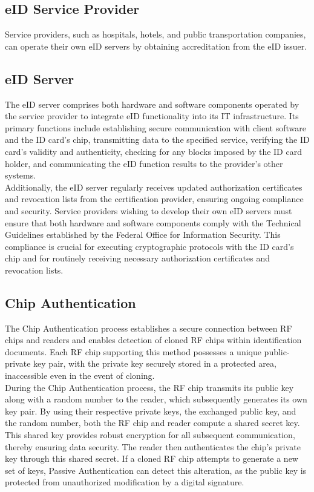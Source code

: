 \documentclass[pdflatex,sn-mathphys-num]{sn-jnl}%
\theoremstyle{thmstyleone}%
\theoremstyle{thmstyletwo}%
\theoremstyle{thmstylethree}%
\begin{document}
\subsection*{eID Service Provider}
Service providers, such as hospitals, hotels, and public transportation companies, can operate their own eID servers by obtaining accreditation from the eID issuer.

\subsection*{eID Server}

The eID server comprises both hardware and software components operated by the service provider to integrate eID functionality into its IT infrastructure. Its primary functions include establishing secure communication with client software and the ID card’s chip, transmitting data to the specified service, verifying the ID card’s validity and authenticity, checking for any blocks imposed by the ID card holder, and communicating the eID function results to the provider’s other systems.\\

Additionally, the eID server regularly receives updated authorization certificates and revocation lists from the certification provider, ensuring ongoing compliance and security. Service providers wishing to develop their own eID servers must ensure that both hardware and software components comply with the Technical Guidelines established by the Federal Office for Information Security. This compliance is crucial for executing cryptographic protocols with the ID card’s chip and for routinely receiving necessary authorization certificates and revocation lists.

\subsection*{Chip Authentication}

The Chip Authentication process establishes a secure connection between RF chips and readers and enables detection of cloned RF chips within identification documents. Each RF chip supporting this method possesses a unique public-private key pair, with the private key securely stored in a protected area, inaccessible even in the event of cloning.\\

During the Chip Authentication process, the RF chip transmits its public key along with a random number to the reader, which subsequently generates its own key pair. By using their respective private keys, the exchanged public key, and the random number, both the RF chip and reader compute a shared secret key. This shared key provides robust encryption for all subsequent communication, thereby ensuring data security. The reader then authenticates the chip’s private key through this shared secret. If a cloned RF chip attempts to generate a new set of keys, Passive Authentication can detect this alteration, as the public key is protected from unauthorized modification by a digital signature.
\end{document}
